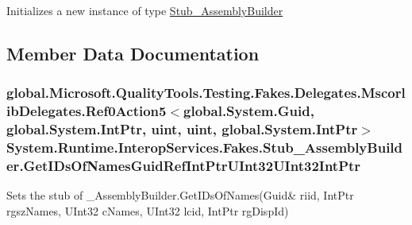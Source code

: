 Initializes a new instance of type \hyperlink{class_system_1_1_runtime_1_1_interop_services_1_1_fakes_1_1_stub___assembly_builder}{Stub\-\_\-\-Assembly\-Builder}



\subsection{Member Data Documentation}
\hypertarget{class_system_1_1_runtime_1_1_interop_services_1_1_fakes_1_1_stub___assembly_builder_a1073419f78a9dd262929f05258ac90f8}{
\subsubsection[{Get\-I\-Ds\-Of\-Names\-Guid\-Ref\-Int\-Ptr\-U\-Int32\-U\-Int32\-Int\-Ptr}]{\setlength{\rightskip}{0pt plus 5cm}global.\-Microsoft.\-Quality\-Tools.\-Testing.\-Fakes.\-Delegates.\-Mscorlib\-Delegates.\-Ref0\-Action5$<$global.\-System.\-Guid, global.\-System.\-Int\-Ptr, uint, uint, global.\-System.\-Int\-Ptr$>$ System.\-Runtime.\-Interop\-Services.\-Fakes.\-Stub\-\_\-\-Assembly\-Builder.\-Get\-I\-Ds\-Of\-Names\-Guid\-Ref\-Int\-Ptr\-U\-Int32\-U\-Int32\-Int\-Ptr}}\label{class_system_1_1_runtime_1_1_interop_services_1_1_fakes_1_1_stub___assembly_builder_a1073419f78a9dd262929f05258ac90f8}


Sets the stub of \-\_\-\-Assembly\-Builder.\-Get\-I\-Ds\-Of\-Names(Guid\& riid, Int\-Ptr rgsz\-Names, U\-Int32 c\-Names, U\-Int32 lcid, Int\-Ptr rg\-Disp\-Id)

